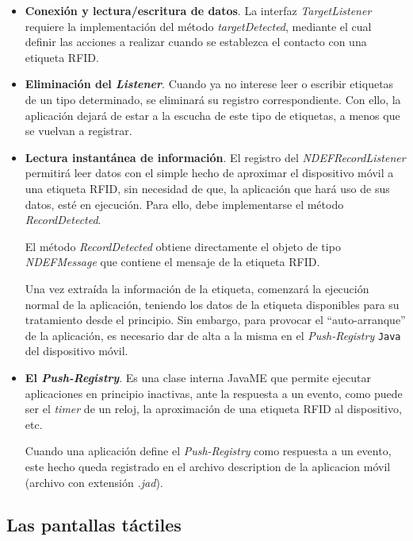 \begin{itemize}
\begin{itemize}
\item \textbf{Conexión y lectura/escritura de datos}. La  interfaz
\emph{TargetListener} requiere la implementación del método
\emph{targetDetected}, mediante el cual definir las acciones a realizar cuando 
se establezca el contacto con una etiqueta \acs{RFID}.

\item \textbf{Eliminación del \emph{Listener}}. Cuando ya no interese leer o 
escribir etiquetas de un tipo determinado, se eliminará su registro 
correspondiente. Con ello, la aplicación dejará de estar a la escucha de este 
tipo de etiquetas, a menos que se vuelvan a registrar.

\item \textbf{Lectura instantánea de información}. El registro del
\emph{NDEFRecordListener} permitirá leer datos con el simple
hecho de aproximar el dispositivo móvil a una etiqueta \acs{RFID}, sin 
necesidad de que, la aplicación que hará uso de sus datos, esté en ejecución.
Para ello, debe implementarse el método \emph{RecordDetected}.

El método \emph{RecordDetected} obtiene directamente el objeto de tipo
\emph{NDEFMessage} que contiene el mensaje de la etiqueta \acs{RFID}.

Una vez extraída la información de la etiqueta, comenzará la ejecución normal
de la aplicación, teniendo los datos de la etiqueta disponibles para su
tratamiento desde el principio. Sin embargo, para provocar el ``auto-arranque''
de la aplicación, es necesario dar de alta a la misma en el
\emph{Push-Registry} \texttt{Java} del dispositivo móvil.

\item \textbf{El \emph{Push-Registry}}. Es una clase interna \acs{JavaME} que 
permite ejecutar aplicaciones en principio inactivas, ante la respuesta a un 
evento, como puede ser el \emph{timer} de un reloj, la aproximación de una 
etiqueta \acs{RFID} al dispositivo, etc.

Cuando una aplicación define el \emph{Push-Registry} como respuesta a un
evento, este hecho queda registrado en el archivo description de la
aplicacion móvil (archivo con extensión \emph{.jad}).
\end{itemize}
\end{itemize}


\subsection{Las pantallas táctiles}

